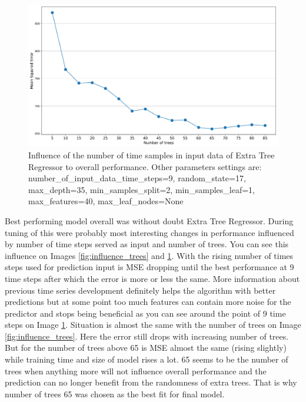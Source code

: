 \documentclass{article}
\begin{document}
\begin{figure}[h!]
\centering
\includegraphics[width=16cm]{imgs/trees_vs_mse.png}
\caption{Influence of the number of time samples in input data of Extra Tree Regressor to overall performance. Other parameters settings are: number\_of\_input\_data\_time\_steps=9, random\_state=17, max\_depth=35, min\_samples\_split=2, min\_samples\_leaf=1, max\_features=40, max\_leaf\_nodes=None}
\label{fig:influence_ts}
\end{figure}

Best performing model overall was without doubt Extra Tree Regressor. During tuning of this were probably most interesting changes in performance influenced by number of time steps served as input and number of trees. You can see this influence on Images \ref{fig:influence_trees} and \ref{fig:influence_ts}. With the rising number of times steps used for prediction input is MSE dropping until the best performance at 9 time steps after which the error is more or less the same. More information about previous time series development definitely helps the algorithm with better predictions but at some point too much features can contain more noise for the predictor and stops being beneficial as you can see around the point of 9 time steps on Image \ref{fig:influence_ts}. Situation is almost the same with the number of trees on Image \ref{fig:influence_trees}. Here the error still drops with increasing number of trees. But for the number of trees above 65 is MSE almost the same (rising slightly) while training time and size of model rises a lot. 65 seems to be the number of trees when anything more will not influence overall performance and the prediction can no longer benefit from the randomness of extra trees. That is why number of trees 65 was chosen as the best fit for final model. 
\end{document}
